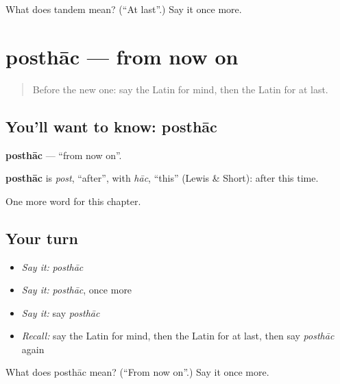 \begin{tcolorbox}[breakable,colback=teal!4,colframe=teal!35!black,title={Before you move on}]
What does tandem mean? (\textquotedblleft{}At last\textquotedblright{}.) Say it once more.
\end{tcolorbox}
\section[posthāc]{posthāc — from now on}

\label{lesson:LA-C175-posthac}



\begin{quote}
Before the new one: say the Latin for mind, then the Latin for at last.
\end{quote}

\subsection*{You'll want to know: posthāc}
\textbf{posthāc} — \textquotedblleft{}from now on\textquotedblright{}.

\begin{cousinweb}
\textbf{posthāc} is \emph{post}, \textquotedblleft{}after\textquotedblright{}, with \emph{hāc}, \textquotedblleft{}this\textquotedblright{} (Lewis \& Short): after this time.
\end{cousinweb}

\begin{grammarlens}[title={What you've built}]
One more word for this chapter.
\end{grammarlens}

\subsection*{Your turn}
\begin{itemize}
\raggedright
  \item \emph{Say it:} \emph{posthāc}
  \item \emph{Say it:} \emph{posthāc}, once more
  \item \emph{Say it:} say \emph{posthāc}
  \item \emph{Recall:} say the Latin for mind, then the Latin for at last, then say \emph{posthāc} again
\end{itemize}

\begin{tcolorbox}[breakable,colback=teal!4,colframe=teal!35!black,title={Before you move on}]
What does posthāc mean? (\textquotedblleft{}From now on\textquotedblright{}.) Say it once more.
\end{tcolorbox}
